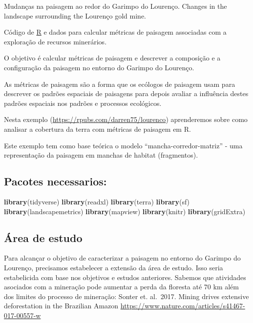 \documentclass[
]{article}
\newenvironment{Shaded}{\begin{snugshade}}{\end{snugshade}}
\newcommand{\FunctionTok}[1]{\textcolor[rgb]{0.13,0.29,0.53}{\textbf{#1}}}
\newcommand{\NormalTok}[1]{#1}
\begin{document}
Mudanças na paisagem ao redor do Garimpo do Lourenço.
Changes in the landscape surrounding the Lourenço gold mine.

Código de \href{https://cran.r-project.org/}{R} e dados para calcular
métricas de paisagem associadas com a exploração de recursos minerários.

O objetivo é calcular métricas de paisagem e descrever a composição e
a configuração da paisagem no entorno do Garimpo do Lourenço.

As métricas de paisagem são a forma que os ecólogos de paisagem usam
para descrever os padrões espaciais de paisagens para depois avaliar
a influência destes padrões espaciais nos padrões e processos ecológicos.

Nesta exemplo (\url{https://rpubs.com/darren75/lourenco}) aprenderemos sobre como analisar a cobertura da terra com métricas de paisagem em R.

Este exemplo tem como base teórica o modelo
``mancha-corredor-matriz'' - uma representação da paisagem em manchas
de habitat (fragmentos).

\newpage

\hypertarget{pacotes-necessarios}{%
\subsection{Pacotes necessarios:}\label{pacotes-necessarios}}

\begin{Shaded}
\begin{Highlighting}[]
\FunctionTok{library}\NormalTok{(tidyverse)}
\FunctionTok{library}\NormalTok{(readxl)}
\FunctionTok{library}\NormalTok{(terra)}
\FunctionTok{library}\NormalTok{(sf)}
\FunctionTok{library}\NormalTok{(landscapemetrics)}
\FunctionTok{library}\NormalTok{(mapview)}
\FunctionTok{library}\NormalTok{(knitr) }
\FunctionTok{library}\NormalTok{(gridExtra)}
\end{Highlighting}
\end{Shaded}

\hypertarget{uxe1rea-de-estudo}{%
\subsection{Área de estudo}\label{uxe1rea-de-estudo}}

Para alcançar o objetivo de caracterizar a paisagem no entorno do
Garimpo do Lourenço, precisamos estabelecer a extensão da área de estudo.
Isso seria estabelicida com base nos objetivos e estudos anteriores.
Sabemos que atividades asociados com a mineração pode aumentar a perda
da floresta até 70 km além dos limites do processo de mineração:
Sonter et. al.~2017.
Mining drives extensive deforestation in the Brazilian Amazon
\url{https://www.nature.com/articles/s41467-017-00557-w}
\end{document}
